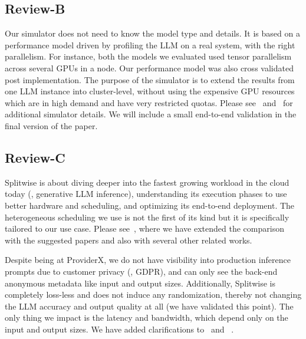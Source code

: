 \subsection{Review-B}
Our simulator does not need to know the model type and details.
It is based on a performance model driven by profiling the LLM on a real system, with the right parallelism.
For instance, both the models we evaluated used tensor parallelism across several GPUs in a node.
Our performance model was also cross validated post implementation.
The purpose of the simulator is to extend the results from one LLM instance into cluster-level, without using the expensive GPU resources which are in high demand and have very restricted quotas.
Please see~ and~ for additional simulator details.
We will include a small end-to-end validation in the final version of the paper.


\subsection{Review-C}
Splitwise is about diving deeper into the fastest growing workload in the cloud today (\ie, generative LLM inference), understanding its execution phases to use better hardware and scheduling, and optimizing its end-to-end deployment.
The heterogeneous scheduling we use is not the first of its kind but it is specifically tailored to our use case.
Please see~, where we have extended the comparison with the suggested papers and also with several other related works.

Despite being at ProviderX, we do not have visibility into production inference prompts due to customer privacy (\eg, GDPR), and can only see the back-end anonymous metadata like input and output sizes. 
Additionally, Splitwise is completely loss-less and does not induce any randomization, thereby not changing the LLM accuracy and output quality at all (we have validated this point).
The only thing we impact is the latency and bandwidth, which depend only on the input and output sizes. 
We have added clarifications to~ and ~.

